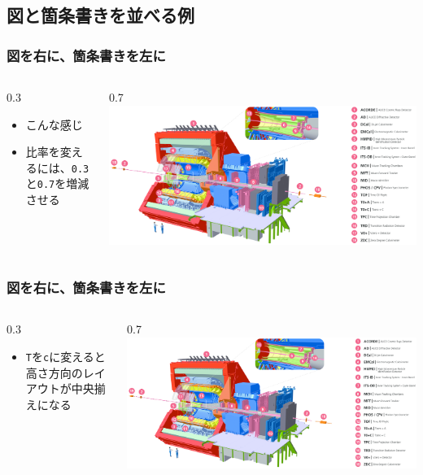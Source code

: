 \documentclass[dvipdfmx,12pt,aspectratio=169]{beamer}
\newlength{\mytotalwidth}
\newlength{\mycolumnwidth}
\begin{document}
\subsection{図と箇条書きを並べる例}
\begin{frame}\frametitle{図を右に、箇条書きを左に}
\begin{columns}[totalwidth=\mytotalwidth]
\begin{column}[T]{0.3\mycolumnwidth}
\begin{itemize}
    \item こんな感じ
    \item 比率を変えるには、\texttt{0.3}と\texttt{0.7}を増減させる
\end{itemize}
\end{column}
\begin{column}[T]{0.7\mycolumnwidth}
\centering
\includegraphics[width=0.7\mycolumnwidth]{ALICE-Run3.png}
\end{column}
\end{columns}
\end{frame}
\begin{frame}\frametitle{図を右に、箇条書きを左に}
\begin{columns}[totalwidth=\mytotalwidth]
\begin{column}[T]{0.3\mycolumnwidth}
\begin{itemize}
    \item \texttt{T}を\texttt{c}に変えると高さ方向のレイアウトが中央揃えになる
\end{itemize}
\end{column}
\begin{column}[T]{0.7\mycolumnwidth}
\centering
\includegraphics[width=0.7\mycolumnwidth]{ALICE-Run3.png}
\end{column}
\end{columns}
\end{frame}
\end{document}
